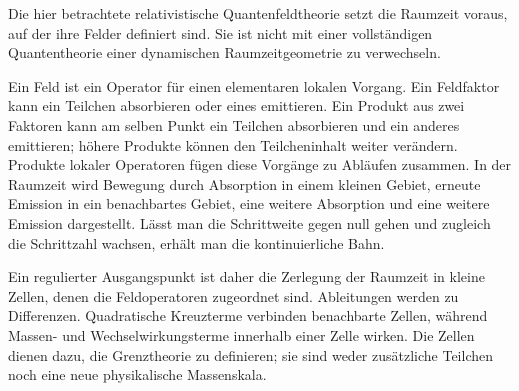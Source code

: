 Die hier betrachtete relativistische Quantenfeldtheorie setzt die Raumzeit voraus, auf der ihre Felder definiert sind. Sie ist nicht mit einer vollständigen Quantentheorie einer dynamischen Raumzeitgeometrie zu verwechseln.

\begin{classroomqa}
\end{classroomqa}

Ein Feld ist ein Operator für einen elementaren lokalen Vorgang. Ein Feldfaktor kann ein Teilchen absorbieren oder eines emittieren. Ein Produkt aus zwei Faktoren kann am selben Punkt ein Teilchen absorbieren und ein anderes emittieren; höhere Produkte können den Teilcheninhalt weiter verändern. Produkte lokaler Operatoren fügen diese Vorgänge zu Abläufen zusammen. In der Raumzeit wird Bewegung durch Absorption in einem kleinen Gebiet, erneute Emission in ein benachbartes Gebiet, eine weitere Absorption und eine weitere Emission dargestellt. Lässt man die Schrittweite gegen null gehen und zugleich die Schrittzahl wachsen, erhält man die kontinuierliche Bahn.

\begin{classroomqa}
\end{classroomqa}

Ein regulierter Ausgangspunkt ist daher die Zerlegung der Raumzeit in kleine Zellen, denen die Feldoperatoren zugeordnet sind. Ableitungen werden zu Differenzen. Quadratische Kreuzterme verbinden benachbarte Zellen, während Massen- und Wechselwirkungsterme innerhalb einer Zelle wirken. Die Zellen dienen dazu, die Grenztheorie zu definieren; sie sind weder zusätzliche Teilchen noch eine neue physikalische Massenskala.


